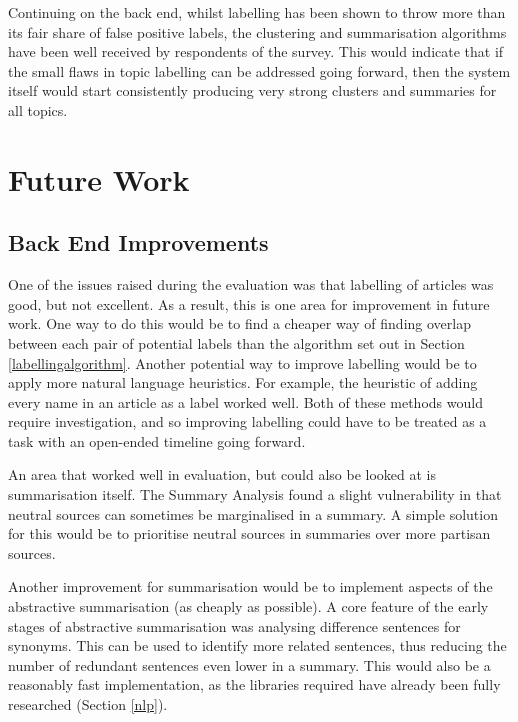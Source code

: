 \documentclass[12pt]{article}
\begin{document}
Continuing on the back end, whilst labelling has been shown to throw more than its fair share of false positive labels, the clustering and summarisation algorithms have been well received by respondents of the survey. This would indicate that if the small flaws in topic labelling can be addressed going forward, then the system itself would start consistently producing very strong clusters and summaries for all topics.


\newpage

\section{Future Work}

\subsection{Back End Improvements}

One of the issues raised during the evaluation was that labelling of articles was good, but not excellent. As a result, this is one area for improvement in future work. One way to do this would be to find a cheaper way of finding overlap between each pair of potential labels than the algorithm set out in Section \ref{labellingalgorithm}. Another potential way to improve labelling would be to apply more natural language heuristics. For example, the heuristic of adding every name in an article as a label worked well. Both of these methods would require investigation, and so improving labelling could have to be treated as a task with an open-ended timeline going forward.

An area that worked well in evaluation, but could also be looked at is summarisation itself. The Summary Analysis found a slight vulnerability in that neutral sources can sometimes be marginalised in a summary. A simple solution for this would be to prioritise neutral sources in summaries over more partisan sources. 

Another improvement for summarisation would be to implement aspects of the abstractive summarisation (as cheaply as possible). A core feature of the early stages of abstractive summarisation was analysing difference sentences for synonyms. This can be used to identify more related sentences, thus reducing the number of redundant sentences even lower in a summary. This would also be a reasonably fast implementation, as the libraries required have already been fully researched (Section \ref{nlp}). 
\end{document}
